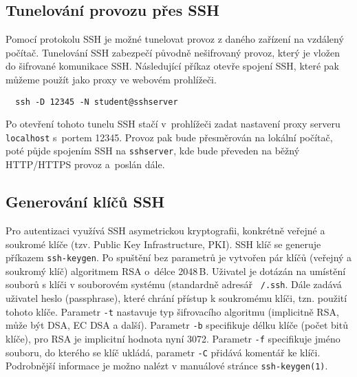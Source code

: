 \subsection{Tunelování provozu přes SSH}
Pomocí protokolu SSH je možné tunelovat provoz z daného zařízení na vzdálený počítač. Tunelování SSH zabezpečí původně nešifrovaný provoz, který je vložen do šifrované komunikace SSH. Následující příkaz otevře spojení SSH, které pak můžeme použít jako proxy ve webovém prohlížeči.
\begin{verbatim}
  ssh -D 12345 -N student@sshserver
\end{verbatim}
Po otevření tohoto tunelu SSH stačí v~prohlížeči zadat nastavení proxy serveru {\tt localhost} s~portem 12345. Provoz pak bude přesměrován na lokální počítač, poté půjde spojením SSH na  {\tt sshserver}, kde bude převeden na běžný HTTP/HTTPS provoz a~poslán dále. 

\subsection{Generování klíčů SSH}
Pro autentizaci využívá SSH asymetrickou kryptografii, konkrétně veřejné a soukromé klíče (tzv. Public Key Infrastructure, PKI). 
SSH klíč se generuje příkazem {\tt ssh-keygen}. Po spuštění bez parametrů je vytvořen pár klíčů (veřejný a soukromý klíč) algoritmem RSA o~délce 2048\,B. Uživatel je dotázán na umístění souborů s klíči v souborovém systému (standardně adresář {\tt ~/.ssh}. Dále zadává uživatel heslo (passphrase), které chrání přístup k soukromému klíči, tzn. použití tohoto klíče. Parametr {\tt -t} nastavuje typ šifrovacího algoritmu (implicitně RSA, může být DSA, EC DSA a další). Parametr {\tt -b} specifikuje délku klíče (počet bitů klíče), pro RSA je implicitní hodnota nyní 3072. Parametr {\tt -f} specifikuje jméno souboru, do kterého se klíč ukládá, parametr {\tt -C} přidává komentář ke klíči. Podrobnější informace je možno nalézt v  manuálové stránce {\tt ssh-keygen(1)}.

